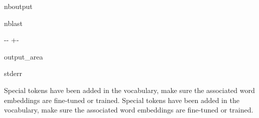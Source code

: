 \documentclass[letterpaper,10pt,english]{sphinxmanual}
\newlength\nbsphinxcodecellspacing
\begin{document}
\begin{sphinxuseclass}{nboutput}
\begin{sphinxuseclass}{nblast}
{

\kern-\sphinxverbatimsmallskipamount\kern-\baselineskip
\kern+\FrameHeightAdjust\kern-\fboxrule
\vspace{\nbsphinxcodecellspacing}

\begin{sphinxuseclass}{output_area}
\begin{sphinxuseclass}{stderr}


\begin{sphinxVerbatim}[commandchars=\\\{\}]
Special tokens have been added in the vocabulary, make sure the associated word embeddings are fine-tuned or trained.
Special tokens have been added in the vocabulary, make sure the associated word embeddings are fine-tuned or trained.
\end{sphinxVerbatim}



\end{sphinxuseclass}
\end{sphinxuseclass}
}

\end{sphinxuseclass}
\end{sphinxuseclass}
\end{document}
